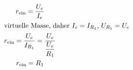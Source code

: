 \begin{gather*}
  r_{\mathrm{ein}} = \frac{U_e}{I_e} \\
  \intertext{virtuelle Masse, daher $I_e = I_{R_1}$, $U_{R_1} = U_e$ }
  r_{\mathrm{ein}} = \frac{U_e}{I_{R_1}} = \frac{U_e}{\dfrac{U_e}{R_1}}\\
  r_{\mathrm{ein}} = R_1\\
\end{gather*}